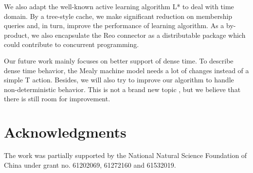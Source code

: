 \documentclass[conference, a4paper]{IEEEtran}
\begin{document}
We also adapt the well-known active learning algorithm L* to deal with time domain.
By a tree-style cache, we make significant reduction on membership queries and, in turn,
improve the performance of learning algorithm. As a by-product, we also encapsulate the Reo
connector as a distributable package which could contribute to concurrent programming.

Our future work mainly focuses on better support of dense time. To describe dense
time behavior, the Mealy machine model needs a lot of changes instead of a simple T action. Besides,
we will also try to improve our algorithm to handle non-deterministic behavior. This is not a brand
new topic \cite{DBLP:conf/isola/VolpatoT14}, but we believe that there is still room for
improvement.  

\section*{Acknowledgments}
The work was partially supported by the National Natural Science Foundation of China under grant no.
61202069, 61272160 and 61532019.


\end{document}
